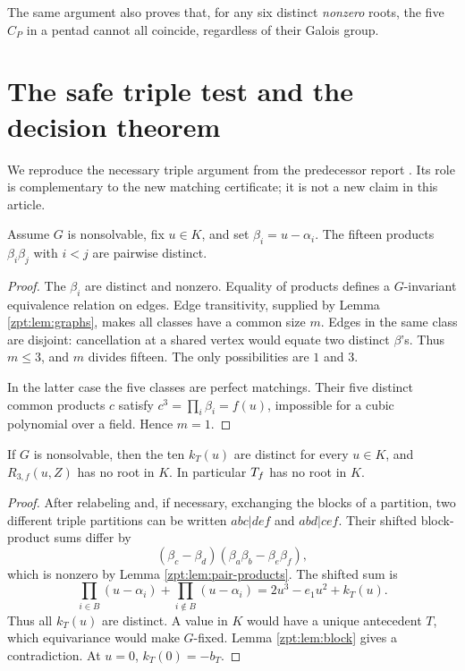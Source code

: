 \documentclass[11pt,letterpaper]{article}
\numberwithin{equation}{section}
\theoremstyle{definition}
\theoremstyle{remark}
\newcommand{\Rthree}{R_{3,f}}
\begin{document}
The same argument also proves that, for any six distinct \emph{nonzero}
roots, the five $C_P$ in a pentad cannot all coincide, regardless of their
Galois group.

\section{The safe triple test and the decision theorem}
\label{zpt:sec:decision}
We reproduce the necessary triple argument from the predecessor report
\cite{zpt:repo-report}. Its role is complementary to the new matching
certificate; it is not a new claim in this article.

\begin{lemma}
\label{zpt:lem:pair-products}
Assume $G$ is nonsolvable, fix $u\in K$, and set $\beta_i=u-\alpha_i$.
The fifteen products $\beta_i\beta_j$ with $i<j$ are pairwise distinct.
\end{lemma}
\begin{proof}
The $\beta_i$ are distinct and nonzero. Equality of products defines a
$G$-invariant equivalence relation on edges. Edge transitivity, supplied
by Lemma \ref{zpt:lem:graphs}, makes all classes have a common size $m$.
Edges in the same class are disjoint: cancellation at a shared vertex
would equate two distinct $\beta$'s. Thus $m\le3$, and $m$ divides fifteen.
The only possibilities are $1$ and $3$.

In the latter case the five classes are perfect matchings. Their five
distinct common products $c$ satisfy
$c^3=\prod_i\beta_i=f(u)$, impossible for a cubic polynomial over a field.
Hence $m=1$.
\end{proof}

\begin{proposition}
\label{zpt:prop:triple}
If $G$ is nonsolvable, then the ten $k_T(u)$ are distinct for every $u\in K$,
and $\Rthree(u,Z)$ has no root in $K$. In particular $T_f$ has no root
in $K$.
\end{proposition}
\begin{proof}
After relabeling and, if necessary, exchanging the blocks of a partition,
two different triple partitions can be written
$abc|def$ and $abd|cef$. Their shifted block-product sums differ by
\[
 (\beta_c-\beta_d)(\beta_a\beta_b-\beta_e\beta_f),
\]
which is nonzero by Lemma \ref{zpt:lem:pair-products}. The shifted sum is
\[
 \prod_{i\in B}(u-\alpha_i)+\prod_{i\notin B}(u-\alpha_i)
 =2u^3-e_1u^2+k_T(u).
\]
Thus all $k_T(u)$ are distinct. A value in $K$ would have a unique
antecedent $T$, which equivariance would make $G$-fixed. Lemma
\ref{zpt:lem:block} gives a contradiction. At $u=0$, $k_T(0)=-b_T$.
\end{proof}
\end{document}
